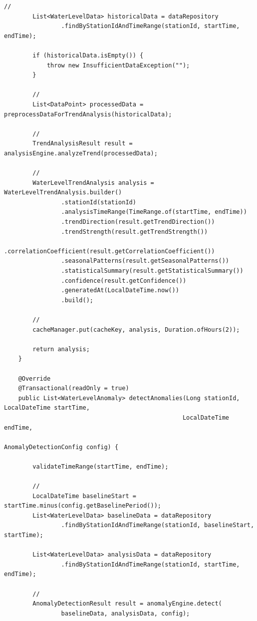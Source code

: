 \begin{lstlisting}[style=java]
        // 
        List<WaterLevelData> historicalData = dataRepository
                .findByStationIdAndTimeRange(stationId, startTime, endTime);
        
        if (historicalData.isEmpty()) {
            throw new InsufficientDataException("");
        }
        
        // 
        List<DataPoint> processedData = preprocessDataForTrendAnalysis(historicalData);
        
        // 
        TrendAnalysisResult result = analysisEngine.analyzeTrend(processedData);
        
        // 
        WaterLevelTrendAnalysis analysis = WaterLevelTrendAnalysis.builder()
                .stationId(stationId)
                .analysisTimeRange(TimeRange.of(startTime, endTime))
                .trendDirection(result.getTrendDirection())
                .trendStrength(result.getTrendStrength())
                .correlationCoefficient(result.getCorrelationCoefficient())
                .seasonalPatterns(result.getSeasonalPatterns())
                .statisticalSummary(result.getStatisticalSummary())
                .confidence(result.getConfidence())
                .generatedAt(LocalDateTime.now())
                .build();
        
        // 
        cacheManager.put(cacheKey, analysis, Duration.ofHours(2));
        
        return analysis;
    }
    
    @Override
    @Transactional(readOnly = true)  
    public List<WaterLevelAnomaly> detectAnomalies(Long stationId, LocalDateTime startTime,
                                                  LocalDateTime endTime,
                                                  AnomalyDetectionConfig config) {
        
        validateTimeRange(startTime, endTime);
        
        // 
        LocalDateTime baselineStart = startTime.minus(config.getBaselinePeriod());
        List<WaterLevelData> baselineData = dataRepository
                .findByStationIdAndTimeRange(stationId, baselineStart, startTime);
                
        List<WaterLevelData> analysisData = dataRepository
                .findByStationIdAndTimeRange(stationId, startTime, endTime);
        
        // 
        AnomalyDetectionResult result = anomalyEngine.detect(
                baselineData, analysisData, config);
        

\end{lstlisting}

